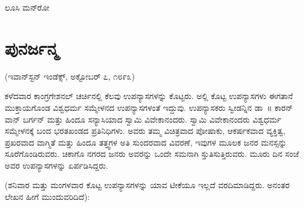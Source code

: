 \begin{flushright}
ಲೂಸಿ ಮನ್‍ರೋ
\end{flushright}


\section{ಪುನರ್ಜನ್ಮ}

\begin{center}
(ಇವಾನ್​ಸ್ಟನ್​ ಇಂಡೆಕ್ಸ್​, ಅಕ್ಟೋಬರ್​ ೭, ೧೮೯೩)
\end{center}

ಕಳೆದವಾರ ಕಾಂಗ್ರಗೇಶನಲ್​ ಚರ್ಚಿನಲ್ಲಿ ಕೆಲವು ಉಪನ್ಯಾಸಗಳನ್ನು ಕೊಟ್ಟರು. ಅಲ್ಲಿ ಕೊಟ್ಟ ಉಪನ್ಯಾಸಗಳು ಈಗತಾನೆ ಮುಕ್ತಾಯಗೊಂಡ ವಿಶ್ವಧರ್ಮ ಸಮ್ಮೇಳನದ ಉಪನ್ಯಾಸಗಳಂತೆ ಇದ್ದುವು. ಉಪನ್ಯಾಸಕರು ಸ್ವೀಡನ್ನಿನ ಡಾ~॥ ಕಾರನ್​ ವಾನ್​ ಬರ್ಗನ್​ ಮತ್ತು ಹಿಂದೂ ಸನ್ಯಾಸಿಯಾದ ಸ್ವಾಮಿ ವಿವೇಕಾನಂದರು. ಸ್ವಾಮಿ ವಿವೇಕಾನಂದರು ವಿಶ್ವಧರ್ಮ ಸಮ್ಮೇಳನಕ್ಕೆ ಬಂದ ಭರತಖಂಡದ ಪ್ರತಿನಿಧಿಗಳು. ಅವರು ತಮ್ಮ ವಿಚಿತ್ರವಾದ ಪೋಷಾಕು, ಆಕರ್ಷಕವಾದ ವ್ಯಕ್ತಿತ್ವ, ಪ್ರಖರವಾದ ವಾಗ್ಮಿತೆ ಮತ್ತು ಹಿಂದೂ ತತ್ತ್ವಗಳ ಅತಿ ಸುಂದರವಾದ ವಿವರಣೆ, ಇವುಗಳ ಮೂಲಕ ಜನರ ಮನಸ್ಸನ್ನು ಸೂರೆಗೊಂಡಿರುವರು. ಚಿಕಾಗೊ ನಗರದ ಜನರು ಅವರನ್ನು ಒಂದೇ ಸಮನಾಗಿ ಸ್ತುತಿಸುತ್ತಿರುವರು. ಮೂರು ದಿನ ಸಂಜೆ ಅವರ ಉಪನ್ಯಾಸಗಳನ್ನು ಏರ್ಪಡಿಸಿದ್ದರು.

(ಶನಿವಾರ ಮತ್ತು ಮಂಗಳವಾರ ಕೊಟ್ಟ ಉಪನ್ಯಾಸಗಳನ್ನು ಯಾವ ಟೀಕೆಯೂ ಇಲ್ಲದೆ ವರದಿಮಾಡಿದ್ದರು. ಅನಂತರ ಲೇಖನ ಹೀಗೆ ಮುಂದುವರಿದಿದೆ):

